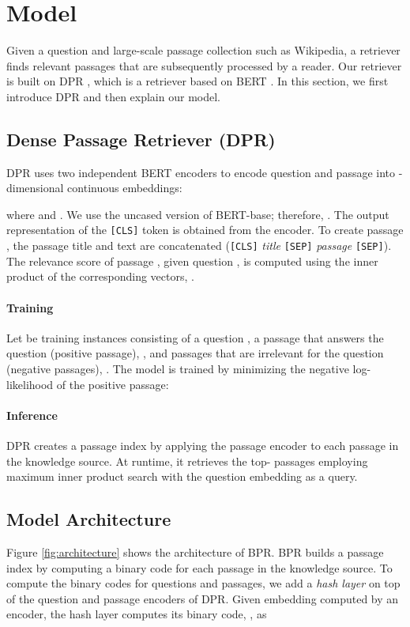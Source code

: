 \documentclass[11pt,a4paper]{article}
\begin{document}
\section{Model}
Given a question and large-scale passage collection such as Wikipedia, a retriever finds relevant passages that are subsequently processed by a reader.
Our retriever is built on DPR \citep{Karpukhin2020DenseAnswering}, which is a retriever based on BERT \cite{devlin2018bert}.
In this section, we first introduce DPR and then explain our model.

\subsection{Dense Passage Retriever (DPR)}

DPR uses two independent BERT encoders to encode question  and passage  into -dimensional continuous embeddings:

where  and .
We use the uncased version of BERT-base; therefore, .
The output representation of the \texttt{[CLS]} token is obtained from the encoder.
To create passage , the passage title and text are concatenated (\texttt{[CLS]} \textit{title} \texttt{[SEP]} \textit{passage} \texttt{[SEP]}).
The relevance score of passage , given question , is computed using the inner product of the corresponding vectors, .

\paragraph{Training}
Let  be  training instances consisting of a question , a passage that answers the question (positive passage), , and  passages that are irrelevant for the question (negative passages), .
The model is trained by minimizing the negative log-likelihood of the positive passage:


\paragraph{Inference}
DPR creates a passage index by applying the passage encoder to each passage in the knowledge source.
At runtime, it retrieves the top- passages employing maximum inner product search with the question embedding as a query.

\subsection{Model Architecture}
Figure \ref{fig:architecture} shows the architecture of BPR.
BPR builds a passage index by computing a binary code for each passage in the knowledge source.
To compute the binary codes for questions and passages, we add a \textit{hash layer} on top of the question and passage encoders of DPR.
Given embedding  computed by an encoder, the hash layer computes its binary code, , as
\end{document}
